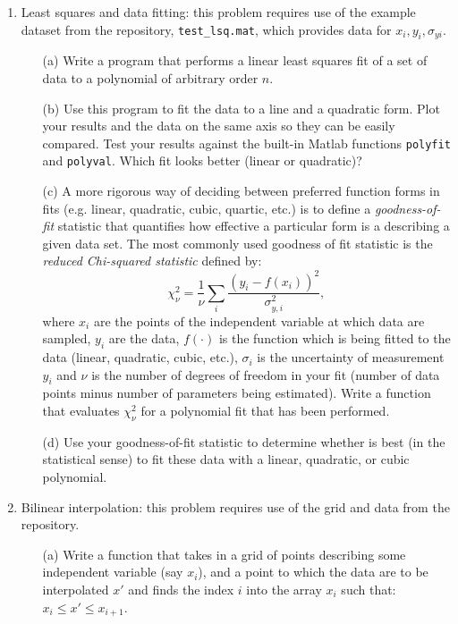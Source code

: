 \documentclass{article}
\begin{document}
\begin{enumerate}
  \item Least squares and data fitting:  this problem requires use of the example dataset from the repository, \texttt{test\_lsq.mat}, which provides data for $x_i,y_i,\sigma_{yi}$.  
  \begin{itemize}
    \item[(a)] Write a program that performs a linear least squares fit of a set of data to a polynomial of arbitrary order $n$.
    \item[(b)] Use this program to fit the data to a line and a quadratic form.  Plot your results and the data on the same axis so they can be easily compared.  Test your results against the built-in Matlab functions \texttt{polyfit} and \texttt{polyval}.  Which fit looks better (linear or quadratic)?  
    \item[(c)] A more rigorous way of deciding between preferred function forms in fits (e.g. linear, quadratic, cubic, quartic, etc.) is to define a \emph{goodness-of-fit} statistic that quantifies how effective a particular form is a describing a given data set.  The most commonly used goodness of fit statistic is the \emph{reduced Chi-squared statistic} defined by:  
    \begin{equation}
      \chi^2_\nu = \frac{1}{\nu} \sum_i \frac{\left( y_i - f(x_i) \right) ^2}{\sigma_{y,i}^2},
    \end{equation}
    where $x_i$ are the points of the independent variable at which data are sampled, $y_i$ are the data, $f(\cdot)$ is the function which is being fitted to the data (linear, quadratic, cubic, etc.), $\sigma_i$ is the uncertainty of measurement $y_i$ and $\nu$ is the number of degrees of freedom in your fit (number of data points minus number of parameters being estimated).  Write a function that evaluates $\chi^2_\nu$ for a polynomial fit that has been performed.  
    \item[(d)] Use your goodness-of-fit statistic to determine whether is best (in the statistical sense) to fit these data with a linear, quadratic, or cubic polynomial.    
  \end{itemize}
  \item Bilinear interpolation:  this problem requires use of the grid and data from the repository.  
  \begin{itemize}
    \item[(a)]  Write a function that takes in a grid of points describing some independent variable (say $x_i$), and a point to which the data are to be interpolated $x'$ and finds the index $i$ into the array $x_i$ such that:  $x_i \le x' \le x_{i+1}$.  

\end{itemize}
\end{enumerate}
\end{document}
